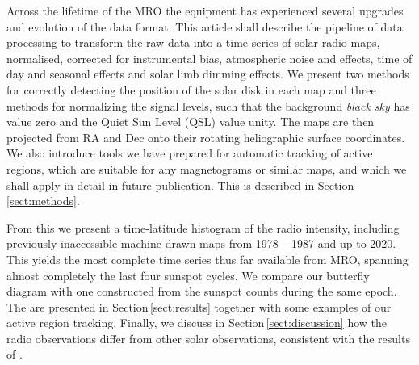 \documentclass{aa}
\begin{document}
  Across the lifetime of the MRO the equipment has experienced several upgrades
  and evolution of the data format.
  This article shall describe the pipeline of data processing to transform the
  raw data into a time series of solar radio maps, normalised, corrected for
  instrumental bias, atmospheric noise and effects, time of day and seasonal
  effects and solar 
  limb dimming effects.
  We present two methods for correctly detecting the position of the solar disk
  in each map and three methods for normalizing the signal levels, such that
  the background \emph{black sky} 
  has value zero and the 
  Quiet Sun Level (QSL) value unity.
  The maps are then projected from RA and Dec onto their rotating heliographic
  surface coordinates.
  We also introduce tools we have prepared for automatic tracking of active 
  regions, which are suitable for any magnetograms or similar maps, and which
  we shall apply in detail in future publication.
  This is 
  described in Section\,\ref{sect:methods}.

  From this we present a time-latitude histogram of the radio intensity,
  including previously inaccessible machine-drawn maps from 1978 -- 1987 and
  up to 2020.
  This yields the most complete time series thus far available from MRO, 
  spanning almost completely the last four sunspot cycles.
  We compare our butterfly diagram with one constructed from the sunspot 
  counts during the same epoch.
  The are presented in Section\,\ref{sect:results} together with some 
  examples of our active region tracking.
  Finally, we discuss in Section\,\ref{sect:discussion} 
  how the radio 
  observations differ from other solar observations, 
  consistent with the 
  results of \citet{Shibasaki13}. 
\end{document}
